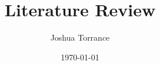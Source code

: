 \documentclass[12pt]{article}
\title{Literature Review}
\author{Joshua Torrance}
\date{\today}
\begin{document}
\maketitle





\printglossaries

\twocolumn
{}

\end{document}
